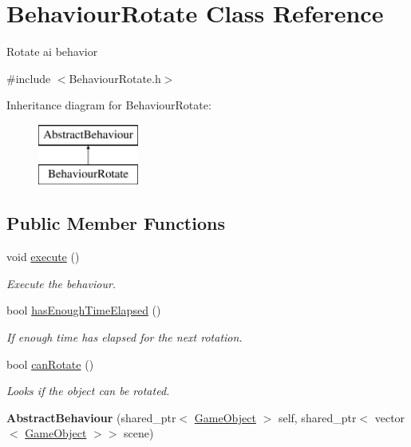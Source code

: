 \hypertarget{class_behaviour_rotate}{}\section{Behaviour\+Rotate Class Reference}
\label{class_behaviour_rotate}


Rotate ai behavior  




{\ttfamily \#include $<$Behaviour\+Rotate.\+h$>$}

Inheritance diagram for Behaviour\+Rotate\+:\begin{figure}[H]
\begin{center}
\leavevmode
\includegraphics[height=2.000000cm]{class_behaviour_rotate}
\end{center}
\end{figure}
\subsection*{Public Member Functions}
\begin{DoxyCompactItemize}
\item 
void \mbox{\hyperlink{class_behaviour_rotate_aa01153f4a487813580ecb5d5145da47c}{execute}} ()
\begin{DoxyCompactList}\small\item\em Execute the behaviour. \end{DoxyCompactList}\item 
bool \mbox{\hyperlink{class_behaviour_rotate_a35e30578ca4a2a7fd96e01573e5791fd}{has\+Enough\+Time\+Elapsed}} ()
\begin{DoxyCompactList}\small\item\em If enough time has elapsed for the next rotation. \end{DoxyCompactList}\item 
bool \mbox{\hyperlink{class_behaviour_rotate_a93f1ef9eb3fe2ea8dfb49a4e435b48a5}{can\+Rotate}} ()
\begin{DoxyCompactList}\small\item\em Looks if the object can be rotated. \end{DoxyCompactList}\item 
\mbox{\label{class_behaviour_rotate_a8a3a9217b3179f949a1d6a32f340c00c}} 
{\bfseries Abstract\+Behaviour} (shared\+\_\+ptr$<$ \mbox{\hyperlink{class_game_object}{Game\+Object}} $>$ self, shared\+\_\+ptr$<$ vector$<$ \mbox{\hyperlink{class_game_object}{Game\+Object}} $>$$>$ scene)
\end{DoxyCompactItemize}
